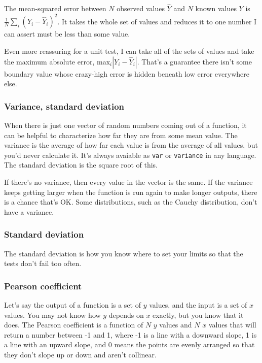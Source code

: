 \documentclass[fleqn,10pt]{olplainarticle}
\begin{document}
The mean-squared error between $N$ observed values $\hat{Y}$ and $N$ known values $Y$ is $\frac{1}{N}\sum_i (Y_i - \hat{Y}_i)^2$.
It takes the whole set of values and reduces it to one number I can assert must be less than some value.

Even more reassuring for a unit test, I can take all of the
sets of values and take the maximum absolute error,
$\mbox{max}_i |Y_i-\hat{Y}_i|$. That's a guarantee there isn't
some boundary value whose crazy-high error is hidden beneath
low error everywhere else.

\subsubsection{Variance, standard deviation}
When there is just one vector of random numbers coming out
of a function, it can be helpful to characterize how far
they are from some mean value. The variance is
the average of how far each value is from the average of all
values, but you'd never calculate it. It's always avaiable
as \lstinline!var! or \lstinline!variance! in any language.
The standard deviation is the square root of this.

If there's no variance, then every value in the vector is
the same. If the variance keeps getting larger when the
function is run again to make longer outputs, there is a
chance that's OK. Some distributions, such as the Cauchy
distribution, don't have a variance.

\subsubsection{Standard deviation}

The standard deviation is how you know where to set your limits
so that the tests don't fail too often.

\subsubsection{Pearson coefficient}
Let's say the output of a function is a set of $y$ values,
and the input is a set of $x$ values. You may not know
how $y$ depends on $x$ exactly, but you know that it
does. The Pearson coefficient is a function of
$N$ $y$ values and $N$ $x$ values that will return a number
between -1 and 1, where -1 is a line with a downward slope,
1 is a line with an upward slope, and 0 means the points
are evenly arranged so that they don't slope up or down
and aren't collinear.
\end{document}
